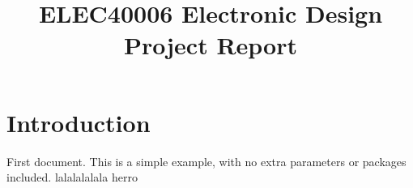 \documentclass{report}
\title{ELEC40006 Electronic Design Project Report}
\author{}
\begin{document}
\section{Introduction}

First document. This is a simple example, with no 
extra parameters or packages included.
lalalalalala
herro
\end{document}
